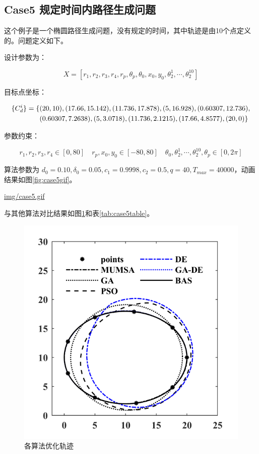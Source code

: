\documentclass[]{ctexbook}
\begin{document}
\subsection{Case5 规定时间内路径生成问题}\label{case5-}

这个例子是一个椭圆路径生成问题，没有规定的时间，其中轨迹是由10个点定义的。问题定义如下。

设计参数为：

\[
X = [r_1,r_2,r_3,r_4,r_p,\theta_p,\theta_0,x_0,y_0,\theta_2^1,\cdots,\theta_2^{10}]
\]

目标点坐标：

\begin{align}
\{C_d^i\} = \{&(20,10),(17.66,15.142),(11.736,17.878),(5,16.928),(0.60307,12.736), \notag \\
&(0.60307,7.2638),(5,3.0718),(11.736,2.1215),(17.66,4.8577),(20,0)\}\notag\\
\end{align}

参数约束：

\[
r_1,r_2,r_3,r_4\in[0,80]\quad r_p,x_0,y_0\in[-80,80]\quad \theta_0,\theta_2^1,\cdots,\theta_2^{10},\theta_p\in[0,2\pi]
\]

算法参数为
\(d_0 = 0.10,\delta_0=0.05,c_1=0.9998,c_2=0.5,q=40,T_{max}=40000\)，动画结果如图\ref{fig:case5gif}。

\url{img/case5.gif}

与其他算法对比结果如图\ref{fig:case5png}和表\ref{tab:case5table}。

\begin{figure}

{\centering \includegraphics[width=0.5\linewidth]{img/case5png} 

}

\caption{各算法优化轨迹}\label{fig:case5png}
\end{figure}
\end{document}
